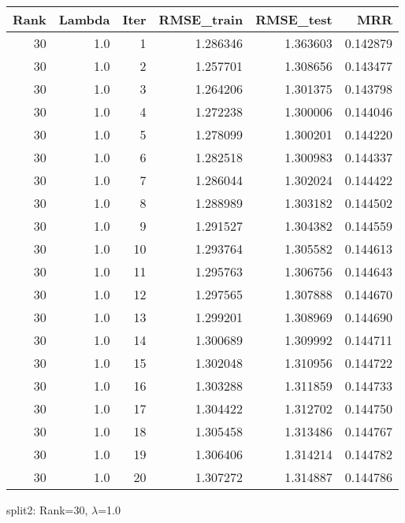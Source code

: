 \begin{tabular}{rrrrrr}
\toprule
 Rank &  Lambda &  Iter &  RMSE\_train &  RMSE\_test &       MRR \\
\midrule
   30 &     1.0 &     1 &    1.286346 &   1.363603 &  0.142879 \\
   30 &     1.0 &     2 &    1.257701 &   1.308656 &  0.143477 \\
   30 &     1.0 &     3 &    1.264206 &   1.301375 &  0.143798 \\
   30 &     1.0 &     4 &    1.272238 &   1.300006 &  0.144046 \\
   30 &     1.0 &     5 &    1.278099 &   1.300201 &  0.144220 \\
   30 &     1.0 &     6 &    1.282518 &   1.300983 &  0.144337 \\
   30 &     1.0 &     7 &    1.286044 &   1.302024 &  0.144422 \\
   30 &     1.0 &     8 &    1.288989 &   1.303182 &  0.144502 \\
   30 &     1.0 &     9 &    1.291527 &   1.304382 &  0.144559 \\
   30 &     1.0 &    10 &    1.293764 &   1.305582 &  0.144613 \\
   30 &     1.0 &    11 &    1.295763 &   1.306756 &  0.144643 \\
   30 &     1.0 &    12 &    1.297565 &   1.307888 &  0.144670 \\
   30 &     1.0 &    13 &    1.299201 &   1.308969 &  0.144690 \\
   30 &     1.0 &    14 &    1.300689 &   1.309992 &  0.144711 \\
   30 &     1.0 &    15 &    1.302048 &   1.310956 &  0.144722 \\
   30 &     1.0 &    16 &    1.303288 &   1.311859 &  0.144733 \\
   30 &     1.0 &    17 &    1.304422 &   1.312702 &  0.144750 \\
   30 &     1.0 &    18 &    1.305458 &   1.313486 &  0.144767 \\
   30 &     1.0 &    19 &    1.306406 &   1.314214 &  0.144782 \\
   30 &     1.0 &    20 &    1.307272 &   1.314887 &  0.144786 \\
\bottomrule
\end{tabular}

\caption{split2: Rank=30, $\lambda$=1.0}
